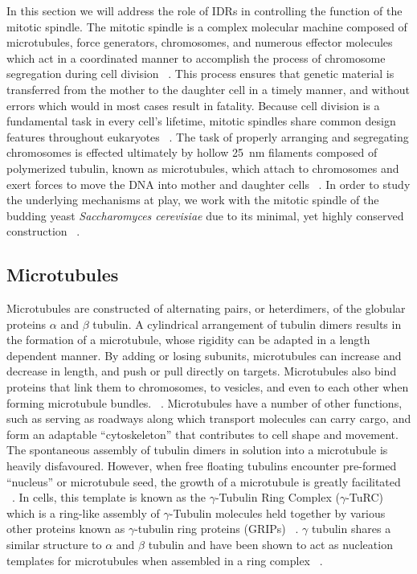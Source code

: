 In this section we will address the role of IDRs in controlling the function of the mitotic spindle. The mitotic spindle is a complex molecular machine composed of microtubules, force generators, chromosomes, and numerous effector molecules which act in a coordinated manner to accomplish the process of chromosome segregation during cell division ~\cite{karsenti2001mitotic}. This process ensures that genetic material is transferred from the mother to the daughter cell in a timely manner, and without errors which would in most cases result in fatality. Because cell division is a fundamental task in every cell's lifetime, mitotic spindles share common design features throughout eukaryotes ~\cite{kubai1976evolution}. The  task  of properly  arranging  and  segregating  chromosomes  is effected ultimately  by hollow \SI{25}{\nm} filaments composed of polymerized tubulin, known as microtubules,  which attach to chromosomes and exert forces to move the  DNA into mother and daughter  cells ~\cite{kline2004mitotic}.  In order to study the underlying mechanisms at play, we work with the mitotic spindle of the budding yeast {\it Saccharomyces cerevisiae} due to its minimal, yet highly conserved construction ~\cite{kubai1976evolution}. 

\subsection{Microtubules}

Microtubules are constructed of alternating pairs, or heterdimers, of the globular proteins $\alpha$ and $\beta$ tubulin. A cylindrical  arrangement  of tubulin  dimers results  in the  formation  of a microtubule, whose rigidity can be adapted in a length dependent manner.   By adding or losing subunits, microtubules can increase and decrease in length, and push or pull directly on targets.  Microtubules also bind proteins that link them to chromosomes, to vesicles, and even to each other when forming microtubule bundles.  ~\cite{dogterom2005force}. Microtubules  have a number  of other  functions,  such  as serving as roadways  along which transport molecules can carry cargo, and form an adaptable “cytoskeleton” that contributes to cell shape and movement. The spontaneous assembly of tubulin dimers in solution into a microtubule is heavily disfavoured. However, when free floating tubulins encounter pre-formed “nucleus” or microtubule seed, the growth of a microtubule is greatly facilitated  ~\cite{joshi1992gamma}. In cells, this template is known as the $\gamma$-Tubulin Ring Complex ($\gamma$-TuRC) which is a ring-like assembly of $\gamma$-Tubulin molecules held together by various other proteins known as $\gamma$-tubulin ring proteins (GRIPs) ~\cite{kollman2011microtubule}. $\gamma$ tubulin shares a similar structure to $\alpha$ and $\beta$ tubulin and have been shown to act as nucleation templates for microtubules when assembled in a ring complex ~\cite{kollman2011microtubule}. 

